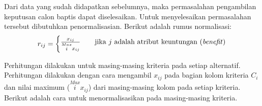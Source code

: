 \documentclass[a4paper,twoside]{article}
\begin{document}
\begin{enumerate}
\begin{center}
\begin{tabular}{|l|r|r|r|r|r|r|r|}
  \end{tabular}
\end{center}
Dari data yang sudah didapatkan sebelumnya, maka permasalahan pengambilan keputusan calon baptis dapat diselesaikan. Untuk menyelesaikan permasalahan tersebut dibutuhkan penormalisasian. Berikut adalah rumus normalisasi:
	\[ r_{ij}  =
  \begin{cases}
    \frac{x_{ij}}{\stackrel{Max}{i} x_{ij}}      & \quad \text{jika } j \text{ adalah atribut keuntungan (\textit{benefit})}\\
	\end{cases}	  
\]

Perhitungan dilakukan untuk masing-masing kriteria pada setiap alternatif. Perhitungan dilakukan dengan cara mengambil $x_{ij}$ pada bagian kolom kriteria $C_{i}$ dan nilai maximum (${\stackrel{Max}{i} x_{ij}}$) dari masing-masing kolom pada setiap kriteria. Berikut adalah cara untuk menormalisasikan pada masing-masing kriteria.


\end{enumerate}
\end{document}
